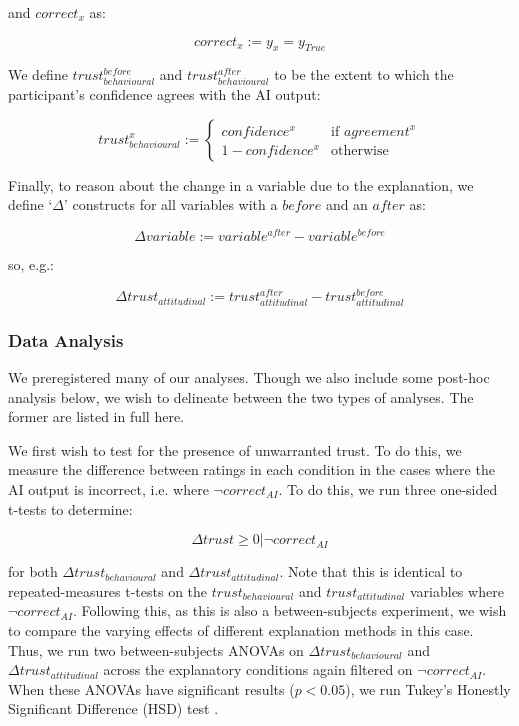 \noindent and $correct_{x}$ as:

\begin{equation}
    correct_{x} := y_{x} = y_{True}
\end{equation}

We define $trust_{behavioural}^{before}$ and $trust_{behavioural}^{after}$ to be the extent to which the participant's confidence agrees with the AI output:

\begin{equation}
    trust_{behavioural}^{x} := \begin{cases}
        confidence^{x}      & \text{if } agreement^{x} \\
        1-confidence^{x}    & \text{otherwise}
    \end{cases}
\end{equation}

Finally, to reason about the change in a variable due to the explanation, we define `$\Delta$' constructs for all variables with a $before$ and an $after$ as:

\begin{equation}
    \Delta variable := variable^{after} - variable^{before}
\end{equation}

\noindent so, e.g.:

\begin{equation}
    \Delta trust_{attitudinal} := trust_{attitudinal}^{after} - trust_{attitudinal}^{before}
\end{equation}

\subsubsection{Data Analysis}
We preregistered many of our analyses. Though we also include some post-hoc analysis below, we wish to delineate between the two types of analyses. The former are listed in full here.

We first wish to test for the presence of unwarranted trust. To do this, we measure the difference between ratings in each condition in the cases where the AI output is incorrect, i.e. where $\neg correct_{AI}$. To do this, we run three one-sided t-tests \cite{caldwell_power_nodate} to determine:

\begin{equation}
    \Delta trust \geq 0 | \neg correct_{AI}
\end{equation}

\noindent for both $\Delta trust_{behavioural}$ and $\Delta trust_{attitudinal}$. Note that this is identical to repeated-measures t-tests on the $trust_{behavioural}$ and $trust_{attitudinal}$ variables where $\neg correct_{AI}$. Following this, as this is also a between-subjects experiment, we wish to compare the varying effects of different explanation methods in this case. Thus, we run two between-subjects ANOVAs \cite{caldwell_power_nodate} on $\Delta trust_{behavioural}$ and $\Delta trust_{attitudinal}$ across the explanatory conditions again filtered on $\neg correct_{AI}$. When these ANOVAs have significant results ($p < 0.05$), we run Tukey's Honestly Significant Difference (HSD) test \cite{caldwell_power_nodate}.

